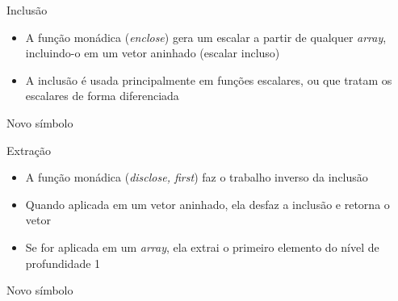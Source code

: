 \begin{frame}[fragile]{Inclusão}

    \begin{itemize}
        \item A função monádica  (\textit{enclose}) gera um escalar a partir de qualquer \textit{array}, incluindo-o em um vetor aninhado (escalar incluso)
        \pause

        \item A inclusão é usada principalmente em funções escalares, ou que tratam os escalares de
            forma diferenciada
    \end{itemize}

\end{frame}

\begin{frame}[fragile]{Novo símbolo}


\end{frame}

\begin{frame}[fragile]{Extração}

    \begin{itemize}
        \item A função monádica  (\textit{disclose, first}) faz o trabalho inverso da inclusão
        \pause

        \item Quando aplicada em um vetor aninhado, ela desfaz a inclusão e retorna o vetor
        \pause

        \item Se for aplicada em um \textit{array}, ela extrai o primeiro elemento do nível de profundidade 1
    \end{itemize}

\end{frame}

\begin{frame}[fragile]{Novo símbolo}


\end{frame}


